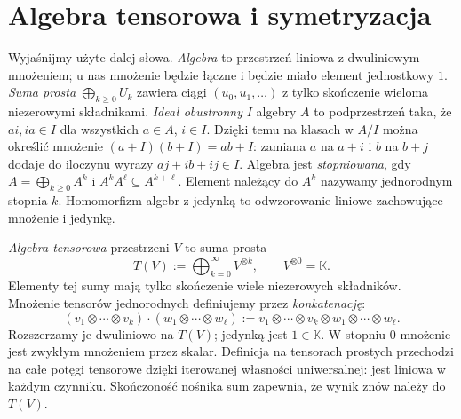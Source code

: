 \section{Algebra tensorowa i symetryzacja}
\label{sec:algebra-tensorowa}

Wyjaśnijmy użyte dalej słowa. \emph{Algebra} to przestrzeń
liniowa z dwuliniowym mnożeniem; u nas mnożenie będzie
łączne i będzie miało element jednostkowy $1$.
\emph{Suma prosta} $\bigoplus_{k\geq0}U_k$ zawiera ciągi
$(u_0,u_1,\ldots)$ z tylko skończenie wieloma niezerowymi
składnikami. \emph{Ideał obustronny} $I$ algebry $A$ to
podprzestrzeń taka, że $ai,ia\in I$ dla wszystkich
$a\in A$, $i\in I$. Dzięki temu na klasach w $A/I$
można określić mnożenie $(a+I)(b+I)=ab+I$:
zamiana $a$ na $a+i$ i $b$ na $b+j$ dodaje do
iloczynu wyrazy $aj+ib+ij\in I$. Algebra jest
\emph{stopniowana}, gdy $A=\bigoplus_{k\geq0}A^k$
i $A^kA^\ell\subseteq A^{k+\ell}$. Element należący do $A^k$ nazywamy
jednorodnym stopnia $k$. Homomorfizm algebr z jedynką to
odwzorowanie liniowe zachowujące mnożenie i jedynkę.

\begin{samepage}
\begin{definicja}
\label{def:algebra-tensorowa}
\emph{Algebra tensorowa} przestrzeni $V$ to suma prosta
\[
 T(V):=\bigoplus_{k=0}^{\infty}V^{\otimes k},
 \qquad V^{\otimes0}=\mathbb K.
\]
Elementy tej sumy mają tylko skończenie wiele niezerowych
składników. Mnożenie tensorów jednorodnych definiujemy przez
\emph{konkatenację}:
\[
 (v_1\otimes\cdots\otimes v_k)
 \cdot(w_1\otimes\cdots\otimes w_\ell)
 :=v_1\otimes\cdots\otimes v_k\otimes w_1\otimes\cdots\otimes w_\ell.
\]
Rozszerzamy je dwuliniowo na $T(V)$; jedynką jest $1\in\mathbb K$.
W stopniu $0$ mnożenie jest zwykłym mnożeniem przez skalar.
Definicja na tensorach prostych przechodzi na całe potęgi tensorowe
dzięki iterowanej własności uniwersalnej: jest liniowa w każdym
czynniku. Skończoność nośnika sum zapewnia, że wynik znów należy do $T(V)$.
\end{definicja}
\end{samepage}

